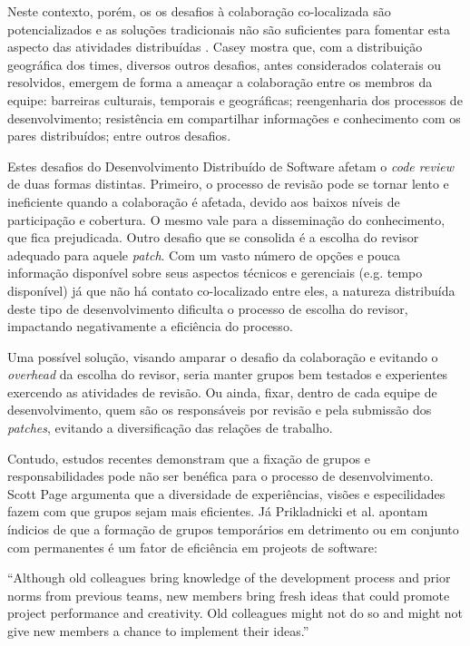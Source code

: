 \documentclass[
        12pt,
        openany, %
        oneside, %
        a4paper,
        english,
        brazil			        %
        ]{abntbibufjf}
\begin{document}
  Neste contexto, porém, os os desafios à colaboração co-localizada são potencializados e as soluções tradicionais não são suficientes para fomentar esta aspecto das atividades distribuídas \cite{nicolaci2011}. Casey \cite{casey2010} mostra que, com a distribuição geográfica dos times, diversos outros desafios, antes considerados colaterais ou resolvidos, emergem de forma a ameaçar a colaboração entre os membros da equipe: barreiras culturais, temporais e geográficas; reengenharia dos processos de desenvolvimento; resistência em compartilhar informações e conhecimento com os pares distribuídos; entre outros desafios.

  Estes desafios do Desenvolvimento Distribuído de Software afetam o \textit{code review} de duas formas distintas. Primeiro, o processo de revisão pode se tornar lento e ineficiente quando a colaboração é afetada, devido aos baixos níveis de participação e cobertura. O mesmo vale para a disseminação do conhecimento, que fica prejudicada. Outro desafio que se consolida é a escolha do revisor adequado para aquele \textit{patch}. Com um vasto número de opções e pouca informação disponível sobre seus aspectos técnicos e gerenciais (e.g. tempo disponível) já que não há contato co-localizado entre eles, a natureza distribuída deste tipo de desenvolvimento dificulta o processo de escolha do revisor, impactando negativamente a eficiência do processo.

  Uma possível solução, visando amparar o desafio da colaboração e evitando o \textit{overhead} da escolha do revisor, seria manter grupos bem testados e experientes exercendo as atividades de revisão. Ou ainda, fixar, dentro de cada equipe de desenvolvimento, quem são os responsáveis por revisão e pela submissão dos \textit{patches}, evitando a diversificação das relações de trabalho.

  Contudo, estudos recentes demonstram que a fixação de grupos e responsabilidades pode não ser benéfica para o processo de desenvolvimento. Scott Page \cite{page2008} argumenta que a diversidade de experiências, visões e especilidades fazem com que grupos sejam mais eficientes. Já Prikladnicki et al. \cite{prikladnicki2017} apontam índicios de que a formação de grupos temporários em detrimento ou em conjunto com permanentes é um fator de eficiência em projeots de software:

  \begin{description}
    ``Although old colleagues bring knowledge of the development process and prior norms from previous teams, new members bring fresh ideas that could promote project performance and creativity. Old colleagues might not do so and might not give new members a chance to implement their ideas.''
  \end{description}
\end{document}
